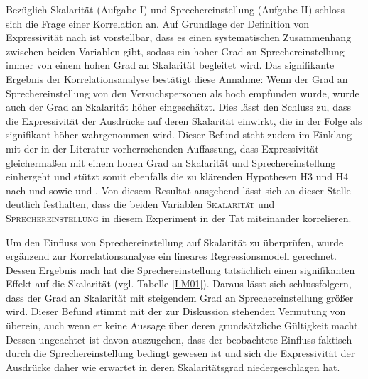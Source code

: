 Bezüglich Skalarität (Aufgabe I) und Sprechereinstellung (Aufgabe II) schloss sich die Frage einer Korrelation an. Auf Grundlage der Definition von Expressivität nach \citet[133]{Gutzmann.2019a} ist vorstellbar, dass es einen systematischen Zusammenhang zwischen beiden Variablen gibt, sodass ein hoher Grad an Sprechereinstellung immer von einem hohen Grad an Skalarität begleitet wird. Das signifikante Ergebnis der Korrelationsanalyse bestätigt diese Annahme: Wenn der Grad an Sprechereinstellung von den Versuchspersonen als hoch empfunden wurde, wurde auch der Grad an Skalarität höher eingeschätzt. Dies lässt den Schluss zu, dass die Expressivität der Ausdrücke auf deren Skalarität einwirkt, die in der Folge als signifikant höher wahrgenommen wird. Dieser Befund steht zudem im Einklang mit der in der Literatur vorherrschenden Auffassung, dass Expressivität gleichermaßen mit einem hohen Grad an Skalarität und Sprechereinstellung einhergeht und stützt somit ebenfalls die zu klärenden {Hypothesen H3 und H4} nach \citet[22]{Paradis.1997} und {\citet[133]{Gutzmann.2019a}} sowie \citet[315]{Lang.1983} und {\citet[57]{Ortner.2014}}. Von diesem Resultat ausgehend lässt sich an dieser Stelle deutlich festhalten, dass die beiden Variablen \textsc{Skalarität} und \textsc{Sprechereinstellung} in diesem Experiment in der Tat miteinander korrelieren.


Um den Einfluss von Sprechereinstellung auf Skalarität zu überprüfen, wurde ergänzend zur Korrelationsanalyse ein lineares Regressionsmodell gerechnet. Dessen Ergebnis nach hat die Sprechereinstellung tatsächlich einen signifikanten Effekt auf die Skalarität (vgl. Tabelle \ref{LM01}). Daraus lässt sich schlussfolgern, dass der Grad an Skalarität mit steigendem Grad an Sprechereinstellung größer wird. Dieser Befund stimmt mit der zur Diskussion stehenden Vermutung von {\citet[133]{Gutzmann.2019a}} überein, auch wenn er keine Aussage über deren grundsätzliche Gültigkeit macht. Dessen ungeachtet ist davon auszugehen, dass der beobachtete Einfluss faktisch durch die Sprechereinstellung bedingt gewesen ist und sich die Expressivität der Ausdrücke daher wie erwartet in deren Skalaritätsgrad {niedergeschlagen hat}.




